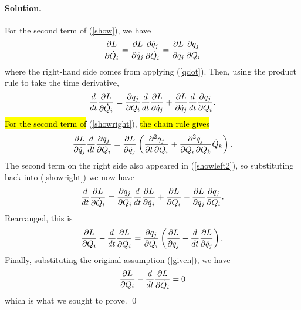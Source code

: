 \documentclass[11pt]{article}
\newcommand{\pder}[2]{\frac{\partial#1}{\partial#2}}
\newcommand{\pmder}[3]{\frac{\partial^2#1}{\partial#2 \, \partial#3}}
\newcommand{\der}[2]{\frac{d#1}{d#2}}
\newcommand{\refeq}[1]{(\ref{#1})}
\newenvironment{solution}
{
    \paragraph{Solution.}
    \ignorespaces
}
{
    \bigskip\bigskip
}
\begin{document}
\begin{enumerate}
\begin{solution}
	For the second term of \refeq{show}, we have
	\begin{equation}
	\pder{L}{\Qd_i} = \pder{L}{\qd_j} \pder{\qd_j}{\Qd_i}  = \pder{L}{\qd_j} \pder{q_j}{Q_i}
	\end{equation}
	where the right-hand side comes from applying \refeq{qdot}.  Then, using the product rule to take the time derivative,
	\begin{equation} \label{showright}
	\der{}{t} \pder{L}{\Qd_i} = \pder{q_j}{Q_i} \der{}{t} \pder{L}{\qd_j} + \pder{L}{\qd_j} \der{}{t} \pder{q_j}{Q_i}.
	\end{equation}
	\hl{For the second term of} \refeq{showright}, \hl{the chain rule gives}
	\begin{equation}
	\pder{L}{\qd_j} \der{}{t} \pder{q_j}{Q_i} =  \pder{L}{\qd_j} \left( \pmder{q_j}{t}{Q_i} + \pmder{q_j}{Q_i}{Q_k} \Qd_k \right).
	\end{equation}
	The second term on the right side also appeared in \refeq{showleft2}, so substituting back into \refeq{showright} we now have
	\begin{equation}
	\der{}{t} \pder{L}{\Qd_i} = \pder{q_j}{Q_i} \der{}{t} \pder{L}{\qd_j} + \pder{L}{Q_i} - \pder{L}{q_j} \pder{q_j}{Q_i}.
	\end{equation}
	Rearranged, this is
	\begin{equation} \label{showright2}
	\pder{L}{Q_i} - \der{}{t} \pder{L}{\Qd_i} = \pder{q_j}{Q_i} \left( \pder{L}{q_j} - \der{}{t} \pder{L}{\qd_j} \right).
	\end{equation}
	Finally, substituting the original assumption \refeq{given}, we have
	\begin{equation} \label{showright2}
	\pder{L}{Q_i} - \der{}{t} \pder{L}{\Qd_i} = 0
	\end{equation}
	which is what we sought to prove. \qed
	

       
    \end{solution}


\end{enumerate}
\end{document}
